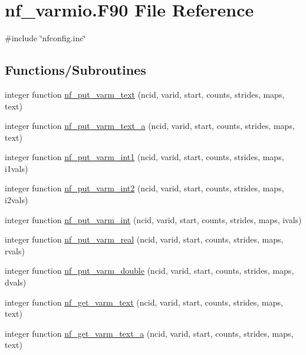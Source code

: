 \hypertarget{nf__varmio_8F90}{}\section{nf\+\_\+varmio.\+F90 File Reference}
\label{nf__varmio_8F90}
{\ttfamily \#include \char`\"{}nfconfig.\+inc\char`\"{}}\newline
\subsection*{Functions/\+Subroutines}
\begin{DoxyCompactItemize}
\item 
integer function \hyperlink{nf__varmio_8F90_a0fc8d9bf654099e612f100cfbd5acbe2}{nf\+\_\+put\+\_\+varm\+\_\+text} (ncid, varid, start, counts, strides, maps, text)
\item 
integer function \hyperlink{nf__varmio_8F90_a2bc071356aa1e670286f67fc79e5d3bb}{nf\+\_\+put\+\_\+varm\+\_\+text\+\_\+a} (ncid, varid, start, counts, strides, maps, text)
\item 
integer function \hyperlink{nf__varmio_8F90_aab4f5152f37a73f4c773af1216e4369f}{nf\+\_\+put\+\_\+varm\+\_\+int1} (ncid, varid, start, counts, strides, maps, i1vals)
\item 
integer function \hyperlink{nf__varmio_8F90_a4b84d7c24776e7b1749a952b083569e0}{nf\+\_\+put\+\_\+varm\+\_\+int2} (ncid, varid, start, counts, strides, maps, i2vals)
\item 
integer function \hyperlink{nf__varmio_8F90_af8be27770cbc46dc207a458c0592a17b}{nf\+\_\+put\+\_\+varm\+\_\+int} (ncid, varid, start, counts, strides, maps, ivals)
\item 
integer function \hyperlink{nf__varmio_8F90_ac19bae8717d854ced6a777ac9bc5ca60}{nf\+\_\+put\+\_\+varm\+\_\+real} (ncid, varid, start, counts, strides, maps, rvals)
\item 
integer function \hyperlink{nf__varmio_8F90_adfa1827cacd22637d30071bbccce558d}{nf\+\_\+put\+\_\+varm\+\_\+double} (ncid, varid, start, counts, strides, maps, dvals)
\item 
integer function \hyperlink{nf__varmio_8F90_a5083d4646b088bf9ba893c056694a856}{nf\+\_\+get\+\_\+varm\+\_\+text} (ncid, varid, start, counts, strides, maps, text)
\item 
integer function \hyperlink{nf__varmio_8F90_a932770113cb6f1b7071fa39a55140af3}{nf\+\_\+get\+\_\+varm\+\_\+text\+\_\+a} (ncid, varid, start, counts, strides, maps, text)
\item 

\end{DoxyCompactItemize}
